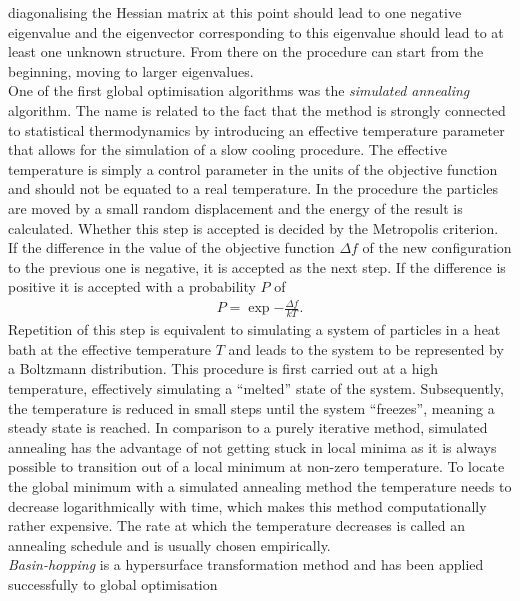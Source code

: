 diagonalising the Hessian matrix at this point should lead to one negative
eigenvalue and the eigenvector corresponding to this eigenvalue should lead to
at least one unknown structure. From there on the procedure can start from
the beginning, moving to larger eigenvalues.
%
\\\newline
One of the first global optimisation algorithms was the \textit{simulated
annealing} algorithm.\autocite{Kirkpatrick_OptimizationSimulatedAnnealing_1983} The
name is related to the fact that the method is strongly connected to statistical
thermodynamics by introducing an effective temperature parameter that allows for
the simulation of a slow cooling procedure. The effective temperature is simply
a control parameter in the units of the objective function and should not be
equated to a real temperature. In the procedure the particles are moved by a
small random displacement and the energy of the result is calculated. Whether
this step is accepted is decided by the Metropolis
criterion.\autocite{Metropolis_EquationStateCalculations_1953} If the difference
in the value of the objective function $\Delta f$ of the new configuration to
the previous one is negative, it is accepted as the next step. If the difference
is positive it is accepted with a probability $P$ of
%
\begin{align}
    P = \exp{-\frac{\Delta f}{kT}}.
\end{align}
%
Repetition of this step is equivalent to simulating a system of particles in a
heat bath at the effective temperature $T$ and leads to the system to be
represented by a Boltzmann distribution. This procedure is first carried out at
a high temperature, effectively simulating a ``melted'' state of the system.
Subsequently, the temperature is reduced in small steps until the system
``freezes'', meaning a steady state is reached. In comparison to a purely
iterative method, simulated annealing has the advantage of not getting stuck in
local minima as it is always possible to transition out of a local minimum at
non-zero temperature. To locate the global minimum with a simulated annealing
method the temperature needs to decrease logarithmically with time, which makes
this method computationally rather expensive. The rate at which the temperature
decreases is called an annealing schedule and is usually chosen empirically.
%
\\\newline
\textit{Basin-hopping} is a hypersurface transformation method and has been
applied successfully to global optimisation
